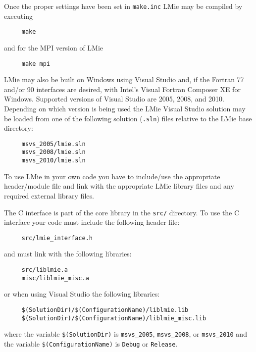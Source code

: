 Once the proper settings have been set in \texttt{make.inc} LMie may be compiled by executing
\begin{verbatim}
     make
\end{verbatim}
and for the MPI version of LMie
\begin{verbatim}
     make mpi
\end{verbatim}


\label{building_and_using_lmie_building_lmie_visual_studio}

LMie may also be built on Windows using Visual Studio and, if the Fortran 77 and/or 90 interfaces are desired, with Intel's Visual Fortran Composer XE for Windows.  Supported versions of Visual Studio are 2005, 2008, and 2010.   Depending on which version is being used the LMie Visual Studio solution may be loaded from one of the following solution (\texttt{.sln}) files relative to the LMie base directory:
\begin{verbatim}
     msvs_2005/lmie.sln
     msvs_2008/lmie.sln
     msvs_2010/lmie.sln
\end{verbatim}


\label{building_and_using_lmie_using_lmie_in_your_code}

To use LMie in your own code you have to include/use the appropriate header/module file and link with the appropriate LMie library files and any required external library files.


\label{building_and_using_lmie_using_lmie_in_your_code_c_cpp}

The C interface is part of the core library in the \texttt{src/} directory.  To use the C interface your code must include the following header file:
\begin{verbatim}
     src/lmie_interface.h
\end{verbatim}
and must link with the following libraries:
\begin{verbatim}
     src/liblmie.a
     misc/liblmie_misc.a
\end{verbatim}
or when using Visual Studio the following libraries:
\begin{verbatim}
     $(SolutionDir)/$(ConfigurationName)/liblmie.lib
     $(SolutionDir)/$(ConfigurationName)/liblmie_misc.lib
\end{verbatim}
where the variable \texttt{\$(SolutionDir)} is \texttt{msvs\_2005}, \texttt{msvs\_2008}, or \texttt{msvs\_2010} and the variable \texttt{\$(ConfigurationName)} is \texttt{Debug} or \texttt{Release}.

